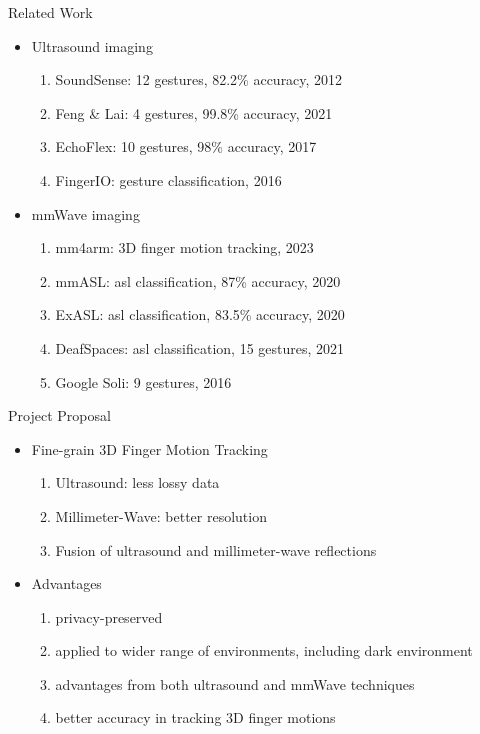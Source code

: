 \documentclass[dvipsnames, handout]{beamer}
\newcommand{\1}{\mathds{1}}	%
\begin{document}
\begin{frame}[t]{Related Work}

\begin{itemize}
\item Ultrasound imaging 
\begin{enumerate}
\item SoundSense: 12 gestures, 82.2\% accuracy, 2012
\item Feng \& Lai: 4 gestures, 99.8\% accuracy, 2021
\item EchoFlex: 10 gestures, 98\% accuracy, 2017
\item FingerIO: gesture classification, 2016
\end{enumerate}

\item mmWave imaging
\begin{enumerate}
\item mm4arm: 3D finger motion tracking, 2023
\item mmASL: asl classification, 87\% accuracy, 2020
\item ExASL: asl classification, 83.5\% accuracy, 2020
\item DeafSpaces: asl classification, 15 gestures, 2021
\item Google Soli: 9 gestures, 2016
\end{enumerate}

\end{itemize}
\end{frame}

\begin{frame}[t]{Project Proposal}

\begin{itemize}
\item Fine-grain 3D Finger Motion Tracking 
\begin{enumerate}
\item Ultrasound: less lossy data
\item Millimeter-Wave: better resolution
\item Fusion of ultrasound and millimeter-wave reflections
\end{enumerate}

\item Advantages
\begin{enumerate}
\item privacy-preserved
\item applied to wider range of environments, including dark environment
\item advantages from both ultrasound and mmWave techniques
\item better accuracy in tracking 3D finger motions
\end{enumerate}

\end{itemize}
\end{frame}
\end{document}
